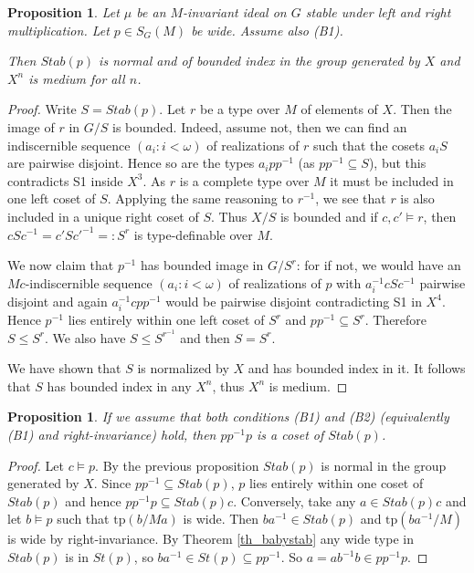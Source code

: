 \documentclass[12pt]{article}
\newtheorem{prop}[thm]{Proposition}
\theoremstyle{definition}
\theoremstyle{mystyle}
\theoremstyle{remark}
\newcommand{\tp}{\mathrm{tp}}
\begin{document}
\begin{prop}\label{prop_normal}
Let $\mu$ be an $M$-invariant ideal on $G$ stable under left and
right multiplication. Let $p\in S_G(M)$ be wide. Assume also (B1).

Then $Stab(p)$ is normal and of bounded index in the group
generated by $X$ and $X^n$ is medium for all $n$.
\end{prop}
\begin{proof}
Write $S=Stab(p)$. Let $r$ be a type over $M$ of elements of $X$. Then the image of $r$ in $G/S$ is bounded. Indeed, assume not, then we can find an indiscernible sequence $(a_i:i<\omega)$ of realizations of $r$ such that the cosets $a_i S$ are pairwise disjoint. Hence so are the types $a_i pp^{-1}$ (as $pp^{-1}\subseteq S$), but this contradicts S1 inside $X^3$. As $r$ is a complete type over $M$ it must be included in one left coset of $S$. Applying the same reasoning to $r^{-1}$, we see that $r$ is also included in a unique right coset of $S$. Thus $X/S$ is bounded and if $c,c'\models r$, then $c S c^{-1} = c' S c'^{-1} =: S^r$ is type-definable over $M$.

We now claim that $p^{-1}$ has bounded image in $G/S^r$: for if not, we would have an $Mc$-indiscernible sequence $(a_i:i<\omega)$ of realizations of $p$ with $a_i^{-1}c Sc^{-1}$ pairwise disjoint and again $a_i^{-1}cpp^{-1}$ would be pairwise disjoint contradicting S1 in $X^4$. Hence $p^{-1}$ lies entirely within one left coset of $S^r$ and $pp^{-1} \subseteq S^r$. Therefore $S\leq S^r$. We also have $S\leq S^{r^{-1}}$ and then $S=S^r$.

We have shown that $S$ is normalized by $X$ and has bounded index in it. It follows that $S$ has bounded index in any $X^n$, thus $X^n$ is medium.
\end{proof}


\begin{prop}
If we assume that both conditions (B1) and (B2) (equivalently (B1) and right-invariance) hold, then $pp^{-1}p$ is a coset of $Stab(p)$.
\end{prop}
\begin{proof}
Let $c\models p$. By the previous proposition $Stab(p)$ is normal in the group generated by $X$. Since $pp^{-1}\subseteq Stab(p)$, $p$ lies entirely within one coset of $Stab(p)$ and hence $pp^{-1}p\subseteq Stab(p)c$. Conversely, take any $a\in Stab(p)c$ and let $b\models p$ such that $\tp(b/Ma)$ is wide. Then $ba^{-1}\in Stab(p)$ and $\tp(ba^{-1}/M)$ is wide by right-invariance. By Theorem \ref{th_babystab} any wide type in $Stab(p)$ is in $St(p)$, so $ba^{-1}\in St(p) \subseteq pp^{-1}$. So $a=ab^{-1}b \in pp^{-1}p$.
\end{proof}
\end{document}
